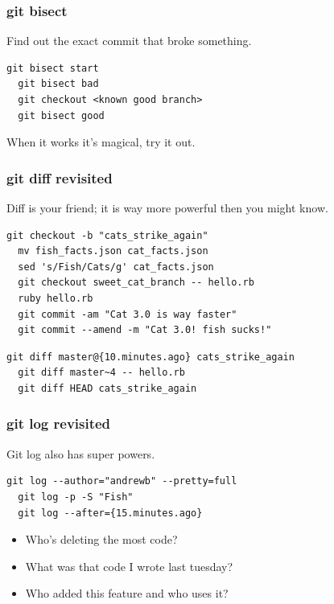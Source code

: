 \documentclass{beamer}
\begin{document}
\begin{frame}[fragile]

\frametitle{git bisect}

Find out the exact commit that broke something.

\vspace{1em}

\begin{lstlisting}[frame=single]
  git bisect start
  git bisect bad
  git checkout <known good branch>
  git bisect good
\end{lstlisting}

When it works it's magical, try it out.

\end{frame}

\begin{frame}[fragile]

\frametitle{git diff revisited}

Diff is your friend; it is way more powerful then you might know.

\vspace{1em}

\begin{lstlisting}[frame=single]
  git checkout -b "cats_strike_again"
  mv fish_facts.json cat_facts.json
  sed 's/Fish/Cats/g' cat_facts.json
  git checkout sweet_cat_branch -- hello.rb
  ruby hello.rb
  git commit -am "Cat 3.0 is way faster"
  git commit --amend -m "Cat 3.0! fish sucks!"
\end{lstlisting}

\vspace{1em}

\begin{lstlisting}[frame=single]
  git diff master@{10.minutes.ago} cats_strike_again
  git diff master~4 -- hello.rb
  git diff HEAD cats_strike_again
\end{lstlisting}

\end{frame}

\begin{frame}[fragile]

\frametitle{git log revisited}

Git log also has super powers.

\vspace{1em}

\begin{lstlisting}[frame=single]
  git log --author="andrewb" --pretty=full   
  git log -p -S "Fish"
  git log --after={15.minutes.ago}
\end{lstlisting}

\begin{itemize}
  \item{Who's deleting the most code?}
  \item{What was that code I wrote last tuesday?}
  \item{Who added this feature and who uses it?}
\end{itemize}
    
\end{frame}
\end{document}
